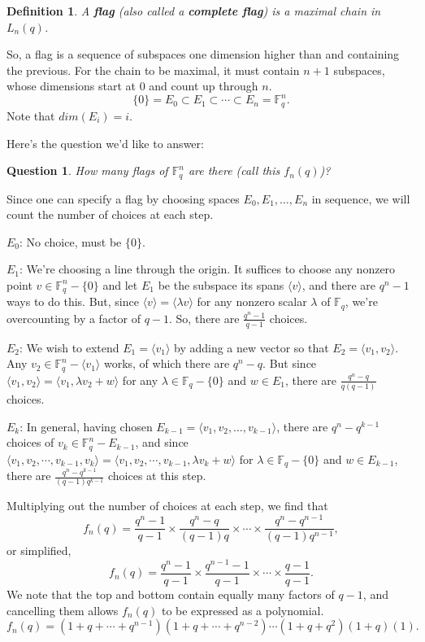 \documentclass[11pt]{article}
\newtheorem{definition}[theorem]{Definition}
\newtheorem{question}[theorem]{Question}
\newcommand{\F}{\mathbb F} %
\newcommand{\angles}[1]{\langle {#1} \rangle}
\begin{document}
\begin{definition} A \textbf{flag} (also called a \textbf{complete flag}) is a maximal chain in $L_n(q)$.
\end{definition}
So, a flag is a sequence of subspaces one dimension higher than and containing the previous. For the chain to be maximal, it must contain $n+1$ subspaces, whose dimensions start at $0$ and count up through $n$.
$$ \{0\} = E_0 \subset E_1 \subset \cdots \subset E_n = \F_q^n.$$ Note that $dim(E_i) = i$.

Here's the question we'd like to answer:

\begin{question} How many flags of $\F_q^n$ are there (call this $f_n(q)$)?
\end{question}

Since one can specify a flag by choosing spaces $E_0, E_1, \dots, E_n$ in sequence, we will count the number of choices at each step.

$E_0$: No choice, must be $\{0\}$.

$E_1$: We're choosing a line through the origin. It suffices to choose any nonzero point $v \in \F_q^n - \{0\}$ and let $E_1$ be the subspace its spans $\angles{v}$, and there are $q^n-1$ ways to do this. But, since $\angles{v}=\angles{\lambda v}$ for any nonzero scalar $\lambda$ of $\F_q$, we're overcounting by a factor of $q-1$. So, there are $\frac{q^n-1}{q-1}$ choices.

$E_2$: We wish to extend $E_1 = \angles{v_1}$ by adding a new vector so that $E_2 = \angles{v_1, v_2}$. Any $v_2 \in \F_q^n - \angles{v_1}$ works, of which there are $q^n - q$. But since $\angles{v_1, v_2} = \angles{v_1, \lambda v_2 + w} $ for any $\lambda \in \F_q - \{0\}$ and $w \in E_1$, there are $\frac{q^n-q}{q(q-1)}$ choices.

$E_k$: In general, having chosen $E_{k-1} = \angles{v_1, v_2, \dots, v_{k-1}}$, there are $q^n-q^{k-1}$ choices of $v_k \in \F_q^n - E_{k-1}$, and since $\angles{v_1, v_2, \cdots, v_{k-1}, v_k} = \angles{v_1, v_2, \cdots, v_{k-1}, \lambda v_k + w}$ for $\lambda \in \F_q - \{0\}$ and $w \in E_{k-1}$, there are $\frac{q^n-q^{k-1}}{(q-1)q^{k-1}}$ choices at this step.

Multiplying out the number of choices at each step, we find that $$f_n(q) = \frac{q^n-1}{q-1} \times \frac{q^n-q}{(q-1)q} \times \cdots \times \frac{q^n-q^{n-1}}{(q-1)q^{n-1}},$$ or simplified, $$f_n(q) = \frac{q^n-1}{q-1} \times \frac{q^{n-1}-1}{q-1} \times \cdots \times \frac{q-1}{q-1}.$$ We note that the top and bottom contain equally many factors of $q-1$, and cancelling them allows $f_n(q)$ to be expressed as a polynomial. $$f_n(q) = \left(1+q+\cdots+q^{n-1} \right)\left(1+q+\cdots+q^{n-2} \right) \cdots \left(1+q+q^2 \right) \left(1+q \right) (1).$$
\end{document}
